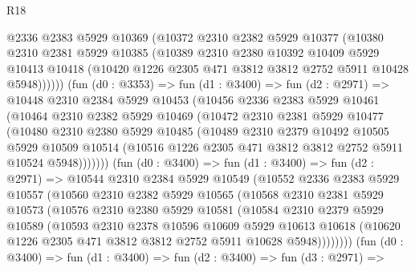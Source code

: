 \begin{lexlean}{R18}
\begin{coremodule}
            @2336
            @2383
            @5929
            @10369
            (@10372
              @2310
              @2382
              @5929
              @10377
              (@10380
                @2310
                @2381
                @5929
                @10385
                (@10389
                  @2310
                  @2380
                  @10392
                  @10409
                  @5929
                  @10413
                  @10418
                  (@10420 @1226 @2305 @471 @3812 @3812 @2752 @5911 @10428 @5948))))))
        (fun (d0 : @3353) =>
        fun (d1 : @3400) =>
        fun (d2 : @2971) =>
        @10448
          @2310
          @2384
          @5929
          @10453
          (@10456
            @2336
            @2383
            @5929
            @10461
            (@10464
              @2310
              @2382
              @5929
              @10469
              (@10472
                @2310
                @2381
                @5929
                @10477
                (@10480
                  @2310
                  @2380
                  @5929
                  @10485
                  (@10489
                    @2310
                    @2379
                    @10492
                    @10505
                    @5929
                    @10509
                    @10514
                    (@10516 @1226 @2305 @471 @3812 @3812 @2752 @5911 @10524 @5948)))))))
        (fun (d0 : @3400) =>
        fun (d1 : @3400) =>
        fun (d2 : @2971) =>
        @10544
          @2310
          @2384
          @5929
          @10549
          (@10552
            @2336
            @2383
            @5929
            @10557
            (@10560
              @2310
              @2382
              @5929
              @10565
              (@10568
                @2310
                @2381
                @5929
                @10573
                (@10576
                  @2310
                  @2380
                  @5929
                  @10581
                  (@10584
                    @2310
                    @2379
                    @5929
                    @10589
                    (@10593
                      @2310
                      @2378
                      @10596
                      @10609
                      @5929
                      @10613
                      @10618
                      (@10620 @1226 @2305 @471 @3812 @3812 @2752 @5911 @10628 @5948))))))))
        (fun (d0 : @3400) =>
        fun (d1 : @3400) =>
        fun (d2 : @3400) =>
        fun (d3 : @2971) =>

\end{coremodule}
\end{lexlean}
